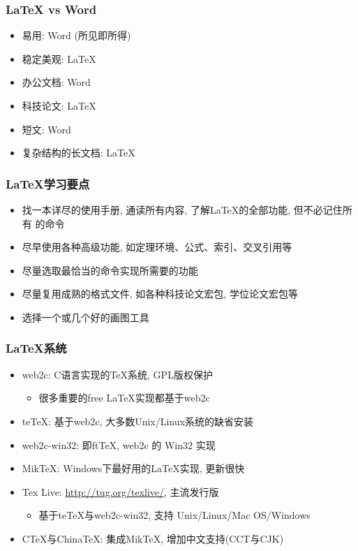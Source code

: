 \documentclass[compress]{beamer}
\begin{document}
\begin{frame}
\frametitle{\LaTeX{} vs Word}
\begin{itemize}
\item 易用: Word (所见即所得)
\item 稳定美观: \LaTeX
\item 办公文档: Word
\item 科技论文: \LaTeX
\item 短文: Word
\item 复杂结构的长文档: \LaTeX
\end{itemize}

\end{frame}

\begin{frame}
  \frametitle{\LaTeX{}学习要点}
\begin{itemize}
\item 找一本详尽的使用手册, 通读所有内容, 了解\LaTeX 的全部功能, 但不必记住所有
的命令
\item 尽早使用各种高级功能, 如定理环境、公式、索引、交叉引用等
\item 尽量选取最恰当的命令实现所需要的功能
\item 尽量复用成熟的格式文件, 如各种科技论文宏包, 学位论文宏包等
\item 选择一个或几个好的画图工具
\end{itemize}

\end{frame}


\begin{frame}
\frametitle{\LaTeX{}系统}
\begin{itemize}
\item web2c: C语言实现的\TeX{}系统, GPL版权保护
    \begin{itemize}
      \item 很多重要的free \LaTeX{}实现都基于web2c
    \end{itemize}
\item teTeX: 基于web2c, 大多数Unix/Linux系统的缺省安装
\item web2c-win32: 即ftTeX, web2c 的 Win32 实现
\item MikTeX: Windows下最好用的\LaTeX{}实现, 更新很快
\item Tex Live: \href{http://tug.org/texlive/}{http://tug.org/texlive/},
    主流发行版
    \begin{itemize}
    \item 基于teTeX与web2c-win32, 支持 Unix/Linux/Mac OS/Windows
    \end{itemize}
\item CTeX与ChinaTeX: 集成MikTeX, 增加中文支持(CCT与CJK)
\end{itemize}

\end{frame}
\end{document}
